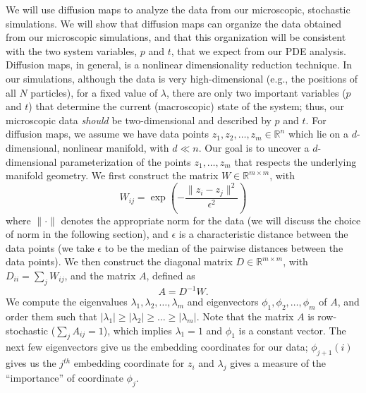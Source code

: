 \documentclass[prl, reprint, final, showkeys]{revtex4-1}
\begin{document}
We will use diffusion maps \cite{coifman2005geometric} to analyze the data from our microscopic, stochastic simulations.
%
We will show that diffusion maps can organize the data obtained from our microscopic simulations, and that this organization will be consistent with the two system variables, $p$ and $t$, that we expect from our PDE analysis.
%
Diffusion maps, in general, is a nonlinear dimensionality reduction technique.
%
In our simulations, although the data is very high-dimensional (e.g., the positions of all $N$ particles), for a fixed value of $\lambda$, there are only two important variables ($p$ and $t$) that determine the current (macroscopic) state of the system; thus, our microscopic data {\em should} be two-dimensional and described by $p$ and $t$.
%
For diffusion maps, we assume we have data points $z_1, z_2, \dots, z_m \in \mathbb{R}^n$ which lie on a $d$-dimensional, nonlinear manifold, with $d \ll n$. 
%
Our goal is to uncover a $d$-dimensional parameterization of the points $z_1, \dots, z_m$ that respects the underlying manifold geometry.
%
We first construct the matrix $W \in \mathbb{R}^{m \times m}$, with
\begin{equation} \label{eq:W}
W_{ij} = \exp \left( -\frac{\|z_i - z_j \|^2}{\epsilon^2} \right)
\end{equation}
where $\| \cdot \|$ denotes the appropriate norm for the data (we will discuss the choice of norm in the following section), and $\epsilon$ is a characteristic distance between the data points (we take $\epsilon$ to be the median of the pairwise distances between the data points).
%
We then construct the diagonal matrix $D \in \mathbb{R}^{m \times m}$, with $D_{ii} = \sum_j W_{ij}$, and the matrix $A$, defined as
\begin{equation}
A = D^{-1} W.
\end{equation}
%
We compute the eigenvalues $\lambda_1, \lambda_2, \dots, \lambda_m$ and eigenvectors $\phi_1, \phi_2, \dots, \phi_m$ of $A$, and order them such that $|\lambda_1| \ge |\lambda_2| \ge \dots \ge |\lambda_m|$. 
%
Note that the matrix $A$ is row-stochastic ($\sum_j A_{ij} = 1$), which implies $\lambda_1 = 1$ and $\phi_1$ is a constant vector.
%
The next few eigenvectors give us the embedding coordinates for our data;
$\phi_{j+1}(i)$ gives us the $j^{th}$ embedding coordinate for $z_i$ and
$\lambda_j$ gives a measure of the ``importance'' of coordinate $\phi_j$.
\end{document}
